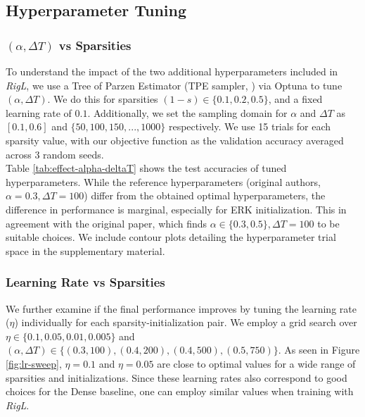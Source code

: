 \subsection{Hyperparameter Tuning}\label{hyperparameter-tuning}



\subsubsection{$(\alpha, \Delta T)$ vs Sparsities} To understand the impact of the two additional hyperparameters included in \textit{RigL}, we use a Tree of Parzen Estimator (TPE sampler, \citet{TPE_Bergstra}) via Optuna to tune $(\alpha, \Delta T)$. We do this for sparsities $(1 - s) \in \{0.1,0.2,0.5\}$, and a fixed learning rate of $0.1$. Additionally, we set the sampling domain for $\alpha$ and $\Delta T$ as $[0.1,0.6]$ and $\{50,100, 150,...,1000\}$ respectively. We use 15 trials for each sparsity value, with our objective function as the validation accuracy averaged across 3 random seeds.\\



Table \ref{tab:effect-alpha-deltaT} shows the test accuracies of tuned hyperparameters. While the reference hyperparameters (original authors, $\alpha=0.3, \Delta T=100$) differ from the obtained optimal hyperparameters, the difference in performance is marginal, especially for ERK initialization. This in agreement with the original paper, which finds $\alpha \in \{0.3, 0.5\}, \Delta T = 100$ to be suitable choices. We include contour plots detailing the hyperparameter trial space in the supplementary material.

\subsubsection{Learning Rate vs Sparsities} We further examine if the final performance improves by tuning the learning rate ($\eta$) individually for each sparsity-initialization pair. We employ a grid search over $\eta \in \{0.1,0.05,0.01,0.005\}$ and $(\alpha, \Delta T) \in \{(0.3, 100), (0.4,200), (0.4, 500), (0.5, 750)\}$. As seen in Figure \ref{fig:lr-sweep}, $\eta = 0.1$ and $\eta = 0.05$ are close to optimal values for a wide range of sparsities and initializations. Since these learning rates also correspond to good choices for the Dense baseline, one can employ similar values when training with \textit{RigL}.

